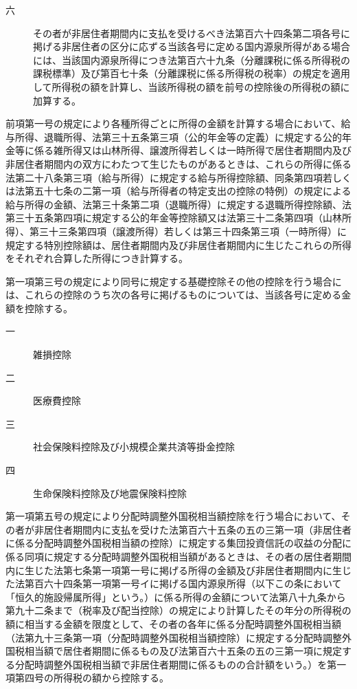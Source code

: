 \documentclass[twocolumn,a4j,10pt]{ltjtarticle}
\begin{document}
\begin{description}
\begin{description}
\item[六]その者が非居住者期間内に支払を受けるべき法第百六十四条第二項各号に掲げる非居住者の区分に応ずる当該各号に定める国内源泉所得がある場合には、当該国内源泉所得につき法第百六十九条（分離課税に係る所得税の課税標準）及び第百七十条（分離課税に係る所得税の税率）の規定を適用して所得税の額を計算し、当該所得税の額を前号の控除後の所得税の額に加算する。
\end{description}
\item[\rensuji{2}]前項第一号の規定により各種所得ごとに所得の金額を計算する場合において、給与所得、退職所得、法第三十五条第三項（公的年金等の定義）に規定する公的年金等に係る雑所得又は山林所得、譲渡所得若しくは一時所得で居住者期間内及び非居住者期間内の双方にわたつて生じたものがあるときは、これらの所得に係る法第二十八条第三項（給与所得）に規定する給与所得控除額、同条第四項若しくは法第五十七条の二第一項（給与所得者の特定支出の控除の特例）の規定による給与所得の金額、法第三十条第二項（退職所得）に規定する退職所得控除額、法第三十五条第四項に規定する公的年金等控除額又は法第三十二条第四項（山林所得）、第三十三条第四項（譲渡所得）若しくは第三十四条第三項（一時所得）に規定する特別控除額は、居住者期間内及び非居住者期間内に生じたこれらの所得をそれぞれ合算した所得につき計算する。
\item[\rensuji{3}]第一項第三号の規定により同号に規定する基礎控除その他の控除を行う場合には、これらの控除のうち次の各号に掲げるものについては、当該各号に定める金額を控除する。
\begin{description}
\item[一]雑損控除
\item[二]医療費控除
\item[三]社会保険料控除及び小規模企業共済等掛金控除
\item[四]生命保険料控除及び地震保険料控除
\end{description}
\item[\rensuji{4}]第一項第五号の規定により分配時調整外国税相当額控除を行う場合において、その者が非居住者期間内に支払を受けた法第百六十五条の五の三第一項（非居住者に係る分配時調整外国税相当額の控除）に規定する集団投資信託の収益の分配に係る同項に規定する分配時調整外国税相当額があるときは、その者の居住者期間内に生じた法第七条第一項第一号に掲げる所得の金額及び非居住者期間内に生じた法第百六十四条第一項第一号イに掲げる国内源泉所得（以下この条において「恒久的施設帰属所得」という。）に係る所得の金額について法第八十九条から第九十二条まで（税率及び配当控除）の規定により計算したその年分の所得税の額に相当する金額を限度として、その者の各年に係る分配時調整外国税相当額（法第九十三条第一項（分配時調整外国税相当額控除）に規定する分配時調整外国税相当額で居住者期間に係るもの及び法第百六十五条の五の三第一項に規定する分配時調整外国税相当額で非居住者期間に係るものの合計額をいう。）を第一項第四号の所得税の額から控除する。

\end{description}
\end{document}
